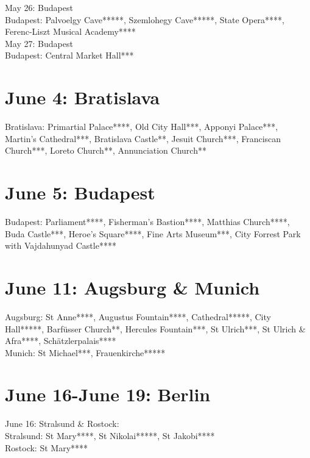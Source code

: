 May 26: Budapest\\

Budapest: Palvoelgy Cave*****, Szemlohegy Cave*****, State Opera****, Ferenc-Liszt Musical Academy****\\

May 27: Budapest\\

Budapest: Central Market Hall***\\

\section{June 4: Bratislava}
\label{2022:Bratislava}

Bratislava: Primartial Palace****, Old City Hall***, Apponyi Palace***, Martin's Cathedral***, Bratislava Castle**, Jesuit Church***, Franciscan Church***, Loreto Church**, Annunciation Church**\\

\section{June 5: Budapest}
\label{2022:BudapestII}

Budapest:  Parliament****, Fisherman's Bastion****, Matthias Church****, Buda Castle***, Heroe's Square****, Fine Arts Museum***, City Forrest Park with Vajdahunyad Castle****\\

\section{June 11: Augsburg \& Munich}
\label{2022:AugsburgMunich}

Augsburg: St Anne****, Augustus Fountain****, Cathedral*****, City Hall*****, Barf\"usser Church**, Hercules Fountain***, St Ulrich***, St Ulrich \& Afra****, Sch\"atzlerpalais****\\
Munich: St Michael***, Frauenkirche*****\\

\section{June 16-June 19:  Berlin}
\label{2022:Berlin}

June 16: Stralsund \& Rostock:\\

Stralsund: St Mary****, St Nikolai*****, St Jakobi****\\
Rostock: St Mary****\\

